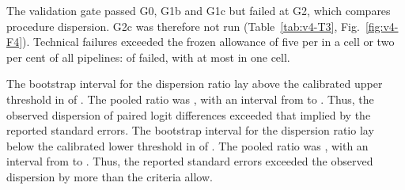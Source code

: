 The validation gate passed G0, G1b and G1c but failed at G2, which compares procedure dispersion. G2c was therefore not run (Table~\ref{tab:v4-T3}, Fig.~\ref{fig:v4-F4}). %
Technical failures exceeded the frozen allowance of five per   in a cell or two per cent of all pipelines:  of   failed, with at most  in one cell. %
\par The bootstrap interval for the dispersion ratio lay above the calibrated upper threshold in  of  . The pooled ratio was , with an interval from  to . Thus, the observed dispersion of paired logit differences exceeded that implied by the reported standard errors. %
The bootstrap interval for the dispersion ratio lay below the calibrated lower threshold in  of  . The pooled ratio was , with an interval from  to . Thus, the reported standard errors exceeded the observed dispersion by more than the criteria allow. %
